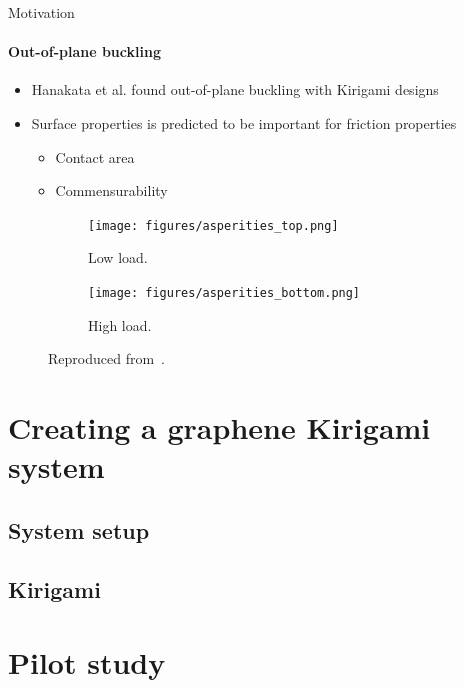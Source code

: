 \documentclass[
	10pt, %
]{beamer}
\begin{document}
\begin{frame}{Motivation}
	\framesubtitle{Out-of-plane buckling}
	\vspace{0.5cm}
	\begin{itemize}
		\item Hanakata et al. \cite{Hanakata_2018,Hanakata_2020} found out-of-plane buckling with Kirigami designs
		\item Surface properties is predicted to be important for friction properties
		\begin{itemize}
			\item Contact area
			\item Commensurability
		\end{itemize}
	\end{itemize}

	\begin{figure}[H]
		\centering
		\begin{subfigure}[b]{0.49\textwidth}
			\centering
			\texttt{[image: figures/asperities\_top.png]}
			\caption{Low load.}
			\label{fig:asp_left}
		\end{subfigure}
		\hfill
		\begin{subfigure}[b]{0.49\textwidth}
			\centering
			\texttt{[image: figures/asperities\_bottom.png]}
			\caption{High load.}
			\label{fig:asp_right}
		\end{subfigure}
		\caption{Reproduced from~\cite{wiki:asperities}.}
	\end{figure}
	  

\end{frame}
	


\section{Creating a graphene Kirigami system} %
\subsection{System setup}
\subsection{Kirigami}




\section{Pilot study} %
\end{document}
